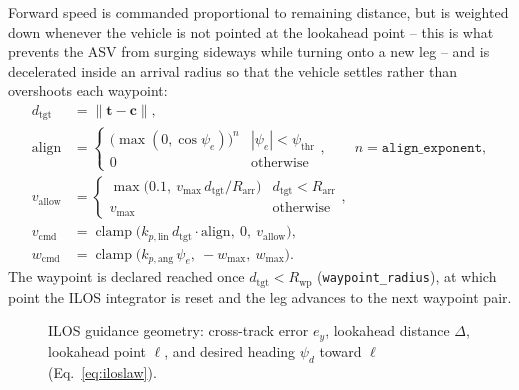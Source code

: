 Forward speed is commanded proportional to remaining distance, but is weighted down whenever the vehicle is not pointed at the lookahead point -- this is what prevents the ASV from surging sideways while turning onto a new leg -- and is decelerated inside an arrival radius so that the vehicle settles rather than overshoots each waypoint:
\begin{align}
d_{\text{tgt}} &= \|\mathbf{t}-\mathbf{c}\|, \\
\text{align} &= \begin{cases} \big(\max(0,\cos\psi_e)\big)^{n} & |\psi_e| < \psi_{\text{thr}} \\ 0 & \text{otherwise} \end{cases}, \qquad n = \texttt{align\_exponent}, \label{eq:align}\\
v_{\text{allow}} &= \begin{cases} \max\!\big(0.1,\ v_{\max}\, d_{\text{tgt}}/R_{\text{arr}}\big) & d_{\text{tgt}} < R_{\text{arr}} \\ v_{\max} & \text{otherwise} \end{cases}, \\
v_{\text{cmd}} &= \operatorname{clamp}\!\big(k_{p,\text{lin}}\, d_{\text{tgt}}\cdot\text{align},\ 0,\ v_{\text{allow}}\big), \\
w_{\text{cmd}} &= \operatorname{clamp}\!\big(k_{p,\text{ang}}\, \psi_e,\ -w_{\max},\ w_{\max}\big).
\end{align}
The waypoint is declared reached once $d_{\text{tgt}} < R_{\text{wp}}$ (\texttt{waypoint\_radius}), at which point the ILOS integrator is reset and the leg advances to the next waypoint pair.

\begin{figure}[H]
\centering
{}
\caption{ILOS guidance geometry: cross-track error $e_y$, lookahead distance $\Delta$, lookahead point $\boldsymbol\ell$, and desired heading $\psi_d$ toward $\boldsymbol\ell$ (Eq.~\eqref{eq:iloslaw}).}
\label{fig:ilos}
\end{figure}

